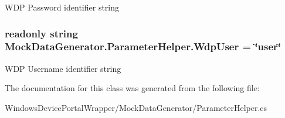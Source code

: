 W\+DP Password identifier string 

\subsubsection[{\texorpdfstring{Wdp\+User}{WdpUser}}]{\setlength{\rightskip}{0pt plus 5cm}readonly string Mock\+Data\+Generator.\+Parameter\+Helper.\+Wdp\+User = \char`\"{}user\char`\"{}\hspace{0.3cm}{\ttfamily [static]}}\hypertarget{class_mock_data_generator_1_1_parameter_helper_ad1fd80b7aebc61379fdec5cfa1164621}{}\label{class_mock_data_generator_1_1_parameter_helper_ad1fd80b7aebc61379fdec5cfa1164621}


W\+DP Username identifier string 



The documentation for this class was generated from the following file\+:\begin{DoxyCompactItemize}
\item 
Windows\+Device\+Portal\+Wrapper/\+Mock\+Data\+Generator/Parameter\+Helper.\+cs\end{DoxyCompactItemize}
